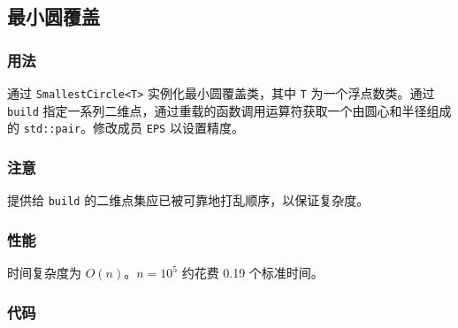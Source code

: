 \subsection{最小圆覆盖}

\subsubsection{用法}

通过 \lstinline{SmallestCircle<T>} 实例化最小圆覆盖类，其中 \lstinline{T} 为一个浮点数类。通过 \lstinline{build} 指定一系列二维点，通过重载的函数调用运算符获取一个由圆心和半径组成的 \lstinline{std::pair}。修改成员 \lstinline{EPS} 以设置精度。

\subsubsection{注意}

提供给 \lstinline{build} 的二维点集应已被可靠地打乱顺序，以保证复杂度。

\subsubsection{性能}

时间复杂度为 $O(n)$。$n = 10^5$ 约花费 0.19 个标准时间。

\subsubsection{代码}


